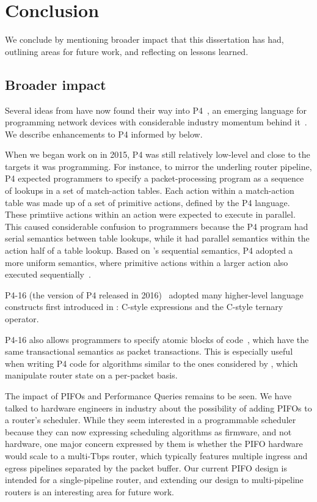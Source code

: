 \chapter{Conclusion}
\label{chap:concl}

We conclude by mentioning broader impact that this dissertation has had,
outlining areas for future work, and reflecting on lessons learned.

\section{Broader impact}
Several ideas from \pktlanguage have now found their way into P4~\cite{p4}, an
emerging language for programming network devices with considerable industry
momentum behind it~\cite{p4org}. We describe enhancements to P4 informed by
\pktlanguage below.
\begin{CompactEnumerate}
\item When we began work on \pktlanguage in 2015, P4 was still relatively
low-level and close to the targets it was programming. For instance, to mirror
the underling router pipeline, P4 expected programmers to specify a
packet-processing program as a sequence of lookups in a set of match-action
tables. Each action within a match-action table was made up of a set of
primitive actions, defined by the P4 language. These primtiive actions within
an action were expected to execute in parallel. This caused considerable
confusion to programmers because the P4 program had serial semantics between
table lookups, while it had parallel semantics within the action half of a
table lookup. Based on \pktlanguage's sequential semantics, P4 adopted a more
uniform semantics, where primitive actions within a larger action also executed
sequentially~\cite{p4_sequential_pr, p4_sequential_issue}.
\item P4-16 (the version of P4 released in 2016)~\cite{p4_16} adopted many
higher-level language constructs first introduced in \pktlanguage: C-style
expressions and the C-style ternary operator.
\item P4-16 also allows programmers to specify atomic blocks of code~\cite{p4_atomic_pr, p4_atomic_issue}, which
have the same transactional semantics as packet transactions. This is
especially useful when writing P4 code for algorithms similar to the ones
considered by \pktlanguage, which manipulate router state on a per-packet
basis.
\end{CompactEnumerate}

The impact of PIFOs and Performance Queries remains to be seen. We have talked
to hardware engineers in industry about the possibility of adding PIFOs to a
router's scheduler. While they seem interested in a programmable scheduler
because they can now expressing scheduling algorithms as firmware, and not
hardware, one major concern expressed by them is whether the PIFO hardware
would scale to a multi-Tbps router, which typically features multiple ingress
and egress pipelines separated by the packet buffer. Our current PIFO design is
intended for a single-pipeline router, and extending our design to
multi-pipeline routers is an interesting area for future work.

